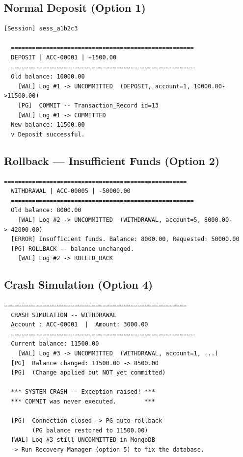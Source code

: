 \subsection{Normal Deposit (Option 1)}

\begin{lstlisting}[style=jsonstyle, caption={Deposit terminal output}]
  [Session] sess_a1b2c3

  ====================================================
  DEPOSIT | ACC-00001 | +1500.00
  ====================================================
  Old balance: 10000.00
    [WAL] Log #1 -> UNCOMMITTED  (DEPOSIT, account=1, 10000.00->11500.00)
    [PG]  COMMIT -- Transaction_Record id=13
    [WAL] Log #1 -> COMMITTED
  New balance: 11500.00
  v Deposit successful.
\end{lstlisting}

\subsection{Rollback --- Insufficient Funds (Option 2)}

\begin{lstlisting}[style=jsonstyle, caption={Rollback terminal output}]
  ====================================================
  WITHDRAWAL | ACC-00005 | -50000.00
  ====================================================
  Old balance: 8000.00
    [WAL] Log #2 -> UNCOMMITTED  (WITHDRAWAL, account=5, 8000.00->-42000.00)
  [ERROR] Insufficient funds. Balance: 8000.00, Requested: 50000.00
  [PG] ROLLBACK -- balance unchanged.
    [WAL] Log #2 -> ROLLED_BACK
\end{lstlisting}

\subsection{Crash Simulation (Option 4)}

\begin{lstlisting}[style=jsonstyle, caption={Crash simulation terminal output}]
  ====================================================
  CRASH SIMULATION -- WITHDRAWAL
  Account : ACC-00001  |  Amount: 3000.00
  ====================================================
  Current balance: 11500.00
    [WAL] Log #3 -> UNCOMMITTED  (WITHDRAWAL, account=1, ...)
  [PG]  Balance changed: 11500.00 -> 8500.00
  [PG]  (Change applied but NOT yet committed)

  *** SYSTEM CRASH -- Exception raised! ***
  *** COMMIT was never executed.        ***

  [PG]  Connection closed -> PG auto-rollback
        (PG balance restored to 11500.00)
  [WAL] Log #3 still UNCOMMITTED in MongoDB
  -> Run Recovery Manager (option 5) to fix the database.
\end{lstlisting}

